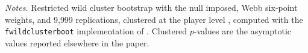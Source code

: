 \begin{table}[htbp]
\centering
\caption{Wild Cluster Bootstrap Inference (Ranking Points)}
\label{tab:wildboot}
\begin{threeparttable}
\small

\begin{tablenotes}
\footnotesize
\item \textit{Notes.} Restricted wild cluster bootstrap with the null imposed, Webb six-point weights, and 9{,}999 replications, clustered at the player level \citep{Cameron2008_wildbootstrap}, computed with the \texttt{fwildclusterboot} implementation of \citet{Roodman2019_fastwild}. Clustered $p$-values are the asymptotic values reported elsewhere in the paper.
\end{tablenotes}
\end{threeparttable}
\end{table}
